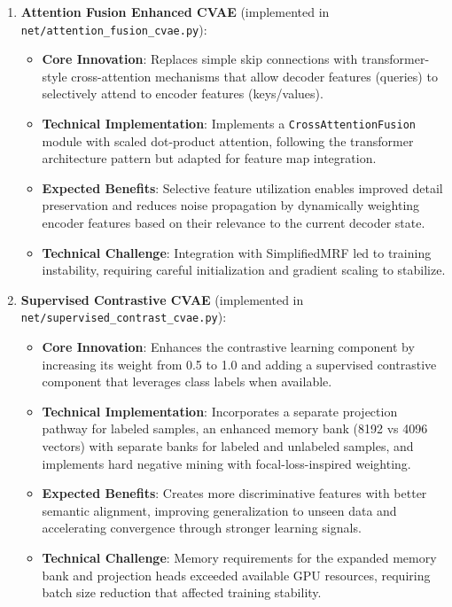 \documentclass[conference]{IEEEtran}
\begin{document}
\begin{enumerate}
    \item \textbf{Attention Fusion Enhanced CVAE} (implemented in \texttt{net/attention\_fusion\_cvae.py}): 
    \begin{itemize}
        \item \textbf{Core Innovation}: Replaces simple skip connections with transformer-style cross-attention mechanisms that allow decoder features (queries) to selectively attend to encoder features (keys/values).
        \item \textbf{Technical Implementation}: Implements a \texttt{CrossAttentionFusion} module with scaled dot-product attention, following the transformer architecture pattern but adapted for feature map integration.
        \item \textbf{Expected Benefits}: Selective feature utilization enables improved detail preservation and reduces noise propagation by dynamically weighting encoder features based on their relevance to the current decoder state.
        \item \textbf{Technical Challenge}: Integration with SimplifiedMRF led to training instability, requiring careful initialization and gradient scaling to stabilize.
    \end{itemize}
    
    \item \textbf{Supervised Contrastive CVAE} (implemented in \texttt{net/supervised\_contrast\_cvae.py}): 
    \begin{itemize}
        \item \textbf{Core Innovation}: Enhances the contrastive learning component by increasing its weight from 0.5 to 1.0 and adding a supervised contrastive component that leverages class labels when available.
        \item \textbf{Technical Implementation}: Incorporates a separate projection pathway for labeled samples, an enhanced memory bank (8192 vs 4096 vectors) with separate banks for labeled and unlabeled samples, and implements hard negative mining with focal-loss-inspired weighting.
        \item \textbf{Expected Benefits}: Creates more discriminative features with better semantic alignment, improving generalization to unseen data and accelerating convergence through stronger learning signals.
        \item \textbf{Technical Challenge}: Memory requirements for the expanded memory bank and projection heads exceeded available GPU resources, requiring batch size reduction that affected training stability.
    \end{itemize}
    

\end{enumerate}
\end{document}
